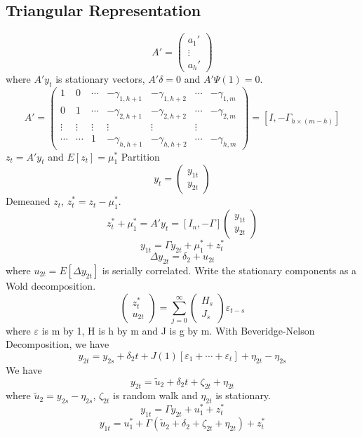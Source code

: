 \documentclass[11pt, a4paper, oneside]{article}
\theoremstyle{definition}
\theoremstyle{proposition}
\theoremstyle{corollary}
\theoremstyle{lemma}
\theoremstyle{theorem}
\begin{document}
\subsection{Triangular Representation}
$$A' = \begin{pmatrix} a_1' \\ \vdots \\ a_h' \end{pmatrix}$$ where $A'y_t$ is stationary vectors, $A'\delta = 0$ and $A'\Psi(1)= 0$.
$$A' = \begin{pmatrix} 1 & 0  & \cdots & -\gamma_{1, h + 1} &- \gamma_{1, h+2} & \cdots & -\gamma_{1, m} \\
0 & 1 & \cdots & -\gamma_{2, h+1} &- \gamma_{2, h+2} & \cdots &- \gamma_{2, m} \\
\vdots & \vdots &  \vdots & \vdots &  \vdots  & \vdots\\
\cdots & \cdots & 1 & -\gamma_{h, h+1} &- \gamma_{h, h+2} & \cdots &- \gamma_{h, m} \end{pmatrix} = [I, -\Gamma_{h\times (m -h)}]$$
$z_t = A'y_t$ and $E[z_t] = \mu_1^*$ Partition $$y_t = \begin{pmatrix} y_{1t} \\ y_{2t}\end{pmatrix}$$
Demeaned $z_t$, $z_t^*  = z_t - \mu_1^*$. 
$$z_t^* + \mu_1^* = A'y_t = [I_n, -\Gamma]\begin{pmatrix} y_{1t} \\ y_{2t} \end{pmatrix}$$
$$y_{1t} = \Gamma y_{2t} + \mu_1^* + z_t^*$$ 
$$\Delta y_{2t} = \delta_2 + u_{2t}$$ where $u_{2t} = E[\Delta y_{2t}]$ is serially correlated. 
Write the stationary components as a Wold decomposition.
$$\begin{pmatrix} z_t^* \\ u_{2t}\end{pmatrix} = \sum_{j=0}^{\infty} \begin{pmatrix} H_s \\ J_s\end{pmatrix} \varepsilon_{t-s}$$ where $\varepsilon$ is m by 1, H is h by m and J is g by m. With Beveridge-Nelson Decomposition, we have
$$y_{2t} = y_{2s} + \delta_2 t + J(1)[\varepsilon_1 +\cdots + \varepsilon_t]+\eta_{2t} - \eta_{2s}$$
We have
$$y_{2t} = \tilde{u}_2 + \delta_2 t + \zeta_ {2t} + \eta_{2t}$$
where $\tilde{u}_2 = y_{2s} - \eta_{2s}$, $\zeta_{2t}$ is random walk and $\eta_{2t}$ is stationary.
$$y_{1t} = \Gamma y_{2t} + u_1^* + z_t^*$$
$$y_{1t} = u_1^* + \Gamma(\tilde{u}_2 + \delta_2 + \zeta_{2t} + \eta_{2t}) + z_t^*$$
\end{document}
